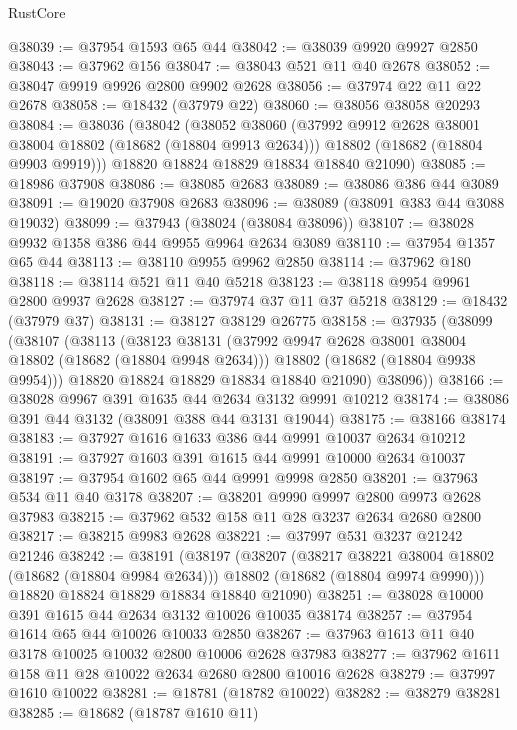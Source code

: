\begin{lexlean}{RustCore}
\begin{coremodule}
@38039 := @37954 @1593 @65 @44
@38042 := @38039 @9920 @9927 @2850
@38043 := @37962 @156
@38047 := @38043 @521 @11 @40 @2678
@38052 := @38047 @9919 @9926 @2800 @9902 @2628
@38056 := @37974 @22 @11 @22 @2678
@38058 := @18432 (@37979 @22)
@38060 := @38056 @38058 @20293
@38084 := @38036
    (@38042
      (@38052
        @38060
        (@37992 @9912 @2628 @38001 @38004 @18802 (@18682 (@18804 @9913 @2634)))
        @18802
        (@18682 (@18804 @9903 @9919)))
      @18820
      @18824
      @18829
      @18834
      @18840
      @21090)
@38085 := @18986 @37908
@38086 := @38085 @2683
@38089 := @38086 @386 @44 @3089
@38091 := @19020 @37908 @2683
@38096 := @38089 (@38091 @383 @44 @3088 @19032)
@38099 := @37943 (@38024 (@38084 @38096))
@38107 := @38028 @9932 @1358 @386 @44 @9955 @9964 @2634 @3089
@38110 := @37954 @1357 @65 @44
@38113 := @38110 @9955 @9962 @2850
@38114 := @37962 @180
@38118 := @38114 @521 @11 @40 @5218
@38123 := @38118 @9954 @9961 @2800 @9937 @2628
@38127 := @37974 @37 @11 @37 @5218
@38129 := @18432 (@37979 @37)
@38131 := @38127 @38129 @26775
@38158 := @37935
    (@38099
      (@38107
        (@38113
          (@38123
            @38131
            (@37992 @9947 @2628 @38001 @38004 @18802 (@18682 (@18804 @9948 @2634)))
            @18802
            (@18682 (@18804 @9938 @9954)))
          @18820
          @18824
          @18829
          @18834
          @18840
          @21090)
        @38096))
@38166 := @38028 @9967 @391 @1635 @44 @2634 @3132 @9991 @10212
@38174 := @38086 @391 @44 @3132 (@38091 @388 @44 @3131 @19044)
@38175 := @38166 @38174
@38183 := @37927 @1616 @1633 @386 @44 @9991 @10037 @2634 @10212
@38191 := @37927 @1603 @391 @1615 @44 @9991 @10000 @2634 @10037
@38197 := @37954 @1602 @65 @44 @9991 @9998 @2850
@38201 := @37963 @534 @11 @40 @3178
@38207 := @38201 @9990 @9997 @2800 @9973 @2628 @37983
@38215 := @37962 @532 @158 @11 @28 @3237 @2634 @2680 @2800
@38217 := @38215 @9983 @2628
@38221 := @37997 @531 @3237 @21242 @21246
@38242 := @38191
    (@38197
      (@38207
        (@38217 @38221 @38004 @18802 (@18682 (@18804 @9984 @2634)))
        @18802
        (@18682 (@18804 @9974 @9990)))
      @18820
      @18824
      @18829
      @18834
      @18840
      @21090)
@38251 := @38028 @10000 @391 @1615 @44 @2634 @3132 @10026 @10035 @38174
@38257 := @37954 @1614 @65 @44 @10026 @10033 @2850
@38267 := @37963 @1613 @11 @40 @3178 @10025 @10032 @2800 @10006 @2628 @37983
@38277 := @37962 @1611 @158 @11 @28 @10022 @2634 @2680 @2800 @10016 @2628
@38279 := @37997 @1610 @10022
@38281 := @18781 (@18782 @10022)
@38282 := @38279 @38281
@38285 := @18682 (@18787 @1610 @11)

\end{coremodule}
\end{lexlean}
